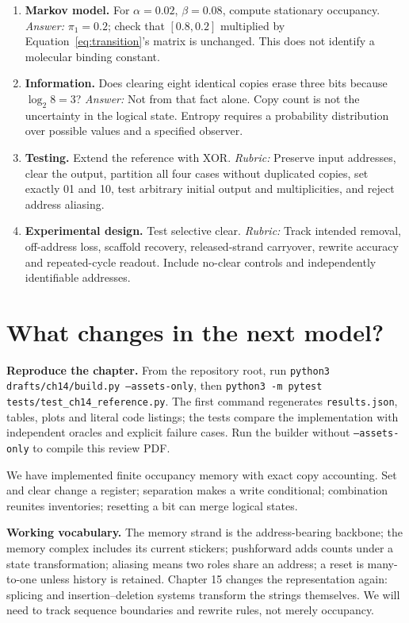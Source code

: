 \begin{enumerate}
\item \textbf{Markov model.} For $\alpha=0.02$, $\beta=0.08$, compute
stationary occupancy. \textit{Answer:} $\pi_1=0.2$; check that
$[0.8,0.2]$ multiplied by Equation~\ref{eq:transition}'s matrix is unchanged.
This does not identify a molecular binding constant.
\item \textbf{Information.} Does clearing eight identical copies erase
three bits because $\log_2 8=3$? \textit{Answer:} Not from that fact alone.
Copy count is not the uncertainty in the logical state. Entropy requires
a probability distribution over possible values and a specified observer.
\item \textbf{Testing.} Extend the reference with XOR.
\textit{Rubric:} Preserve input addresses, clear the output, partition all
four cases without duplicated copies, set exactly 01 and 10, test arbitrary
initial output and multiplicities, and reject address aliasing.
\item \textbf{Experimental design.} Test selective clear.
\textit{Rubric:} Track intended removal, off-address loss, scaffold recovery,
released-strand carryover, rewrite accuracy and repeated-cycle readout.
Include no-clear controls and independently identifiable addresses.
\end{enumerate}

\section{What changes in the next model?}
\textbf{Reproduce the chapter.} From the repository root, run
\texttt{python3 drafts/ch14/build.py --assets-only}, then
\texttt{python3 -m pytest tests/test\_ch14\_reference.py}.
The first command regenerates \texttt{results.json}, tables, plots and literal
code listings; the tests compare the implementation with independent
oracles and explicit failure cases. Run the builder without
\texttt{--assets-only} to compile this review PDF.

We have implemented finite occupancy memory with exact copy accounting.
Set and clear change a register; separation makes a write conditional;
combination reunites inventories; resetting a bit can merge logical states.

\textbf{Working vocabulary.} The memory strand is the address-bearing
backbone; the memory complex includes its current stickers; pushforward
adds counts under a state transformation; aliasing means two roles share
an address; a reset is many-to-one unless history is retained.
Chapter 15 changes the representation again: splicing and
insertion--deletion systems transform the strings themselves. We will need
to track sequence boundaries and rewrite rules, not merely occupancy.
